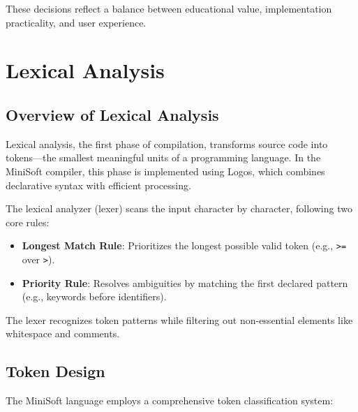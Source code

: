 \documentclass[12pt,a4paper]{article}
\begin{document}
These decisions reflect a balance between educational value, implementation practicality, and user experience.

\section{Lexical Analysis}
\subsection{Overview of Lexical Analysis}
Lexical analysis, the first phase of compilation, transforms source code into tokens—the smallest meaningful units of a programming language. In the MiniSoft compiler, this phase is implemented using Logos, which combines declarative syntax with efficient processing.

The lexical analyzer (lexer) scans the input character by character, following two core rules:

\begin{itemize}
	\item \textbf{Longest Match Rule}: Prioritizes the longest possible valid token (e.g., \texttt{>=} over \texttt{>}).

	\item \textbf{Priority Rule}: Resolves ambiguities by matching the first declared pattern (e.g., keywords before identifiers).
\end{itemize}

The lexer recognizes token patterns while filtering out non-essential elements like whitespace and comments.

\subsection{Token Design}
The MiniSoft language employs a comprehensive token classification system:
\end{document}
